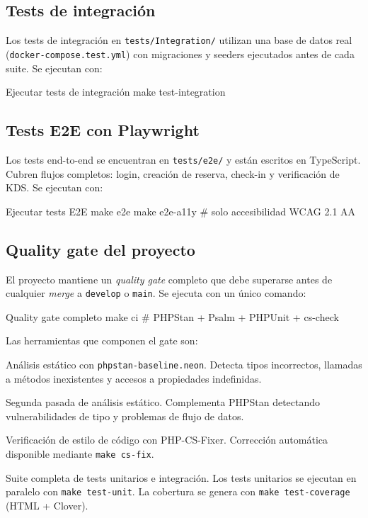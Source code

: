 \documentclass[12pt,a4paper,twoside,openright]{report}
\begin{document}
\subsection{Tests de integración}

Los tests de integración en \texttt{tests/Integration/} utilizan una base de datos
real (\texttt{docker-compose.test.yml}) con migraciones y seeders ejecutados antes
de cada suite. Se ejecutan con:

\begin{bashcode}{Ejecutar tests de integración}
make test-integration
\end{bashcode}

\subsection{Tests E2E con Playwright}

Los tests end-to-end se encuentran en \texttt{tests/e2e/} y están escritos en
TypeScript. Cubren flujos completos: login, creación de reserva, check-in y
verificación de KDS. Se ejecutan con:

\begin{bashcode}{Ejecutar tests E2E}
make e2e
make e2e-a11y   # solo accesibilidad WCAG 2.1 AA
\end{bashcode}

\subsection{Quality gate del proyecto}

El proyecto mantiene un \textit{quality gate} completo que debe superarse antes de
cualquier \textit{merge} a \texttt{develop} o \texttt{main}. Se ejecuta con un único
comando:

\begin{bashcode}{Quality gate completo}
make ci   # PHPStan + Psalm + PHPUnit + cs-check
\end{bashcode}

Las herramientas que componen el gate son:

\begin{description}[nosep]
  \item[PHPStan nivel 5] Análisis estático con \texttt{phpstan-baseline.neon}.
    Detecta tipos incorrectos, llamadas a métodos inexistentes y accesos a propiedades
    indefinidas.
  \item[Psalm] Segunda pasada de análisis estático. Complementa PHPStan detectando
    vulnerabilidades de tipo y problemas de flujo de datos.
  \item[PSR-12] Verificación de estilo de código con PHP-CS-Fixer.
    Corrección automática disponible mediante \texttt{make cs-fix}.
  \item[PHPUnit 13.x] Suite completa de tests unitarios e integración.
    Los tests unitarios se ejecutan en paralelo con \texttt{make test-unit}.
    La cobertura se genera con \texttt{make test-coverage} (HTML + Clover).
\end{description}
\end{document}
